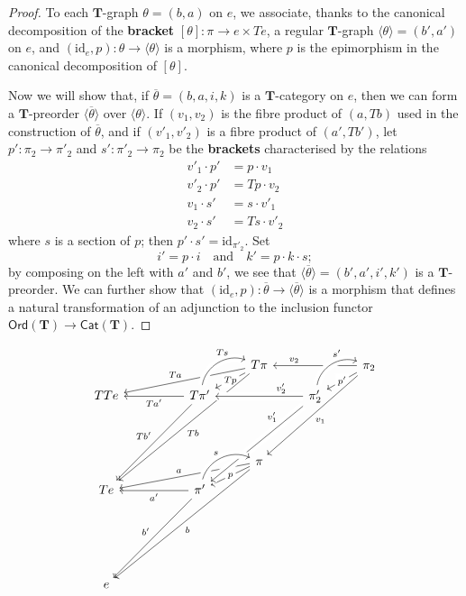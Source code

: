 \documentclass{article}
\newcommand{\oldpage}[1]{\marginpar{\footnotesize$\Big\vert$ \textit{p.~#1}}}
\newcommand{\unsure}[1]{{\color{purple}\textbf{#1}}}
\newcommand{\id}{\mathrm{id}}
\newcommand{\TT}{\mathbf{T}}
\newcommand{\textand}{\quad\text{and}\quad}
\newcommand{\Cat}[1]{\mathsf{#1}}
\newcommand{\Ord}[1]{\Cat{Ord}(#1)}
\begin{document}
\begin{proof}
  To each $\TT$-graph $\theta=(b,a)$ on $e$, we associate, thanks to the canonical decomposition of the \unsure{bracket} $[\theta]\colon\pi\to e\times Te$, a regular $\TT$-graph $\langle\theta\rangle=(b',a')$ on $e$, and $(\id_e,p)\colon\theta\to\langle\theta\rangle$ is a morphism, where $p$ is the epimorphism in the canonical decomposition of $[\theta]$.

  Now we will show that, if $\overline{\theta}=(b,a,i,k)$ is a $\TT$-category on $e$, then we can form a $\TT$-preorder $\langle\overline{\theta}\rangle$ over $\langle\theta\rangle$.
  If $(v_1,v_2)$ is the fibre product of $(a,Tb)$ used in the construction of $\overline{\theta}$, and if $(v'_1,v'_2)$ is a fibre product of $(a',Tb')$, let $p'\colon\pi_2\to\pi'_2$ and $s'\colon\pi'_2\to\pi_2$ be the \unsure{brackets} characterised by the relations
  \[
    \begin{aligned}
      v'_1\cdot p'
    & = p\cdot v_1
    \\v'_2\cdot p'
    & = Tp\cdot v_2
    \\v_1\cdot s'
    & = s\cdot v'_1
    \\v_2\cdot s'
    & = Ts\cdot v'_2
    \end{aligned}
  \]
  where $s$ is a section of $p$;
  then $p'\cdot s'=\id_{\pi'_2}$.
  Set
  \[
    i' = p\cdot i
    \textand
    k' = p\cdot k\cdot s;
  \]
  by composing on the left with $a'$ and $b'$, we see that $\langle\overline{\theta}\rangle=(b',a',i',k')$ is a $\TT$-preorder.
  \oldpage{240}
  We can further show that $(\id_e,p)\colon\overline{\theta}\to\langle\overline{\theta}\rangle$ is a morphism that defines a natural transformation of an adjunction to the inclusion functor $\Ord{\TT}\to\Cat{Cat}(\TT)$.
\end{proof}

\[
  \begin{tikzcd}
  &&&T\pi
      \ar[dlll,swap,"Ta"]
      \ar[dl,"Tp"description]
      \ar[dddlll,"Tb"]
  &&\pi_2
      \ar[ll,near end,swap,"v_2"]
      \ar[dl,"p'"description]
      \ar[ddll,"v_1"]
  \\[-1em]TTe
  && T\pi'
      \ar[ur,bend left=50,near end,"Ts",crossing over]
      \ar[ll,"Ta'"]
      \ar[ddll,swap,"Tb'"]
  &&\pi'_2
      \ar[ur,bend left=50,near end,"s'",crossing over]
      \ar[ll,near start,swap,"v'_2",crossing over]
  \\[2em]
  &&&\pi
      \ar[dlll,swap,"a"]
      \ar[dl,"p"description]
      \ar[dddlll,"b"]
  \\[-1em]Te
  && \pi'
      \ar[from=2-5,near start,swap,"v'_1",crossing over]
      \ar[ll,"a'"]
      \ar[ddll,swap,"b'"]
      \ar[ur,bend left=50,"s",crossing over]
  \\{}
  \\[2em]e
  \end{tikzcd}
\]
\end{document}
